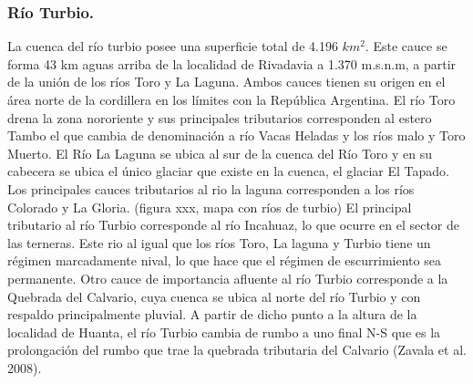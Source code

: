 \documentclass[11pt,]{article}
\begin{document}
		\subsubsection{Río Turbio.}
La cuenca del río turbio posee una superficie total de 4.196 $km^2$. Este cauce se forma 43 km aguas arriba de la localidad de Rivadavia a 1.370 m.s.n.m, a partir de la unión de los ríos Toro y La Laguna. Ambos cauces tienen su origen en el área norte de la cordillera en los límites con la República Argentina. El río Toro drena la zona nororiente y sus principales tributarios corresponden al estero Tambo el que cambia de denominación a río Vacas Heladas y los ríos malo y Toro Muerto. El Río La Laguna se ubica al sur de la cuenca del Río Toro y en su cabecera se ubica el único glaciar que existe en la cuenca, el glaciar El Tapado. Los principales cauces tributarios al rio la laguna corresponden a los ríos Colorado y La Gloria. (figura xxx, mapa con ríos de turbio) El principal tributario al río Turbio corresponde al río Incahuaz, lo que ocurre en el sector de las terneras. Este rio al igual que los ríos Toro, La laguna y Turbio tiene un régimen marcadamente nival, lo que hace que el régimen de escurrimiento sea permanente. Otro cauce de importancia afluente al río Turbio corresponde a la Quebrada del Calvario, cuya cuenca se ubica al norte del río Turbio y con respaldo principalmente pluvial. A partir de dicho punto a la altura de la localidad de Huanta, el río Turbio cambia de rumbo a uno final N-S que es la prolongación del rumbo que trae la quebrada tributaria del Calvario (Zavala et al. 2008).
\end{document}
